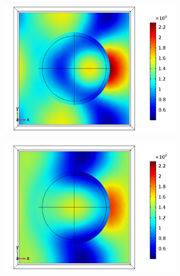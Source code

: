 \begin{figure}[htb!]
   \begin{subfigure}{0.32\textwidth}    %
        \centering
        \includegraphics[width=\linewidth]{figures/ch4/S5A/FieldDistribution/Sample5A_TM_Slice@z=-05t_wl=210_notitle.png}
   \end{subfigure}
      \begin{subfigure}{0.32\textwidth}
        \centering
        \includegraphics[width=\linewidth]{figures/ch4/S5A/FieldDistribution/Sample5A_TM_Slice@z=-05t_wl=270_notitle.png}
   \end{subfigure}
    \begin{subfigure}{0.32\textwidth}
        \centering

\end{subfigure}
\end{figure}
